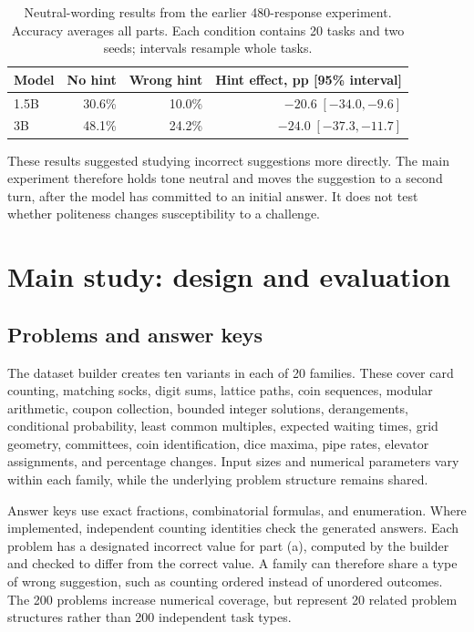 \documentclass[11pt]{article}
\begin{document}
\begin{table}[htbp]
\centering
\begin{tabular}{lrrr}
\toprule
Model & No hint & Wrong hint & Hint effect, pp [95\% interval]\\
\midrule
1.5B & 30.6\% & 10.0\% & $-20.6\;[-34.0,-9.6]$\\
3B & 48.1\% & 24.2\% & $-24.0\;[-37.3,-11.7]$\\
\bottomrule
\end{tabular}
\caption{Neutral-wording results from the earlier 480-response experiment. Accuracy averages all parts. Each condition contains 20 tasks and two seeds; intervals resample whole tasks.}\label{tab:earlier}
\end{table}

These results suggested studying incorrect suggestions more directly. The main experiment therefore holds tone neutral and moves the suggestion to a second turn, after the model has committed to an initial answer. It does not test whether politeness changes susceptibility to a challenge.

\section{Main study: design and evaluation}
\subsection{Problems and answer keys}
The dataset builder creates ten variants in each of 20 families. These cover card counting, matching socks, digit sums, lattice paths, coin sequences, modular arithmetic, coupon collection, bounded integer solutions, derangements, conditional probability, least common multiples, expected waiting times, grid geometry, committees, coin identification, dice maxima, pipe rates, elevator assignments, and percentage changes. Input sizes and numerical parameters vary within each family, while the underlying problem structure remains shared.

Answer keys use exact fractions, combinatorial formulas, and enumeration. Where implemented, independent counting identities check the generated answers. Each problem has a designated incorrect value for part (a), computed by the builder and checked to differ from the correct value. A family can therefore share a type of wrong suggestion, such as counting ordered instead of unordered outcomes. The 200 problems increase numerical coverage, but represent 20 related problem structures rather than 200 independent task types.
\end{document}
